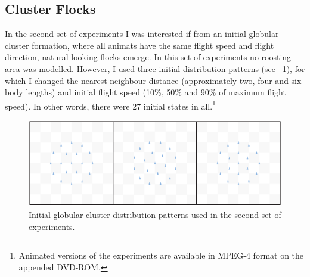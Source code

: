 \subsection{Cluster Flocks}
In the second set of experiments I was interested if from an initial globular cluster formation, where all animats have the same flight speed and flight direction, natural looking flocks emerge. In this set of experiments no roosting area was modelled. However, I used three initial distribution patterns (see \fig~\ref{fig:exp:02:ini}), for which I changed the nearest neighbour distance (approximately two, four and six body lengths) and initial flight speed (10\%, 50\% and 90\% of maximum flight speed). In other words, there were 27 initial states in all.\footnote{Animated versions of the experiments are available in MPEG-4 format on the appended DVD-ROM.}

\begin{figure}%
\includegraphics{fig[exp02ini]}
\caption{Initial globular cluster distribution patterns used in the second set of experiments.}
\label{fig:exp:02:ini}
\end{figure}

